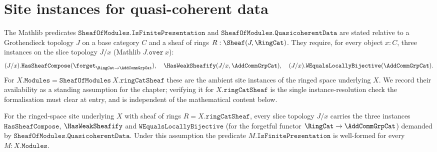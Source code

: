 \section{Site instances for quasi-coherent data}
\label{sec:lbc_site_instances}


The Mathlib predicates \(\mathtt{SheafOfModules.IsFinitePresentation}\) and
\(\mathtt{SheafOfModules.QuasicoherentData}\) are stated relative to a
Grothendieck topology \(J\) on a base category \(C\) and a sheaf of rings
\(R : \Sheaf(J, \RingCat)\). They require, for every object \(x : C\), three
instances on the slice topology \(J/x\) (Mathlib \(J.\mathtt{over}\ x\)):
\[
  (J/x).\mathtt{HasSheafCompose}(\forget_{\RingCat \to \AddCommGrpCat}),\quad
  \HasWeakSheafify(J/x, \AddCommGrpCat),\quad
  (J/x).\mathtt{WEqualsLocallyBijective}(\AddCommGrpCat).
\]
For \(X.\mathtt{Modules} = \mathtt{SheafOfModules}\ X.\mathtt{ringCatSheaf}\)
these are the ambient site instances of the ringed space underlying \(X\). We
record their availability as a standing assumption for the chapter; verifying it
for \(X.\mathtt{ringCatSheaf}\) is the single instance-resolution check the
formalisation must clear at entry, and is independent of the mathematical
content below.

\begin{remark}
  \label{rem:lbc_site_instances}
  For the ringed-space site underlying \(X\) with sheaf of rings
  \(R = X.\mathtt{ringCatSheaf}\), every slice topology \(J/x\) carries the
  three instances \(\mathtt{HasSheafCompose}\), \(\HasWeakSheafify\) and
  \(\mathtt{WEqualsLocallyBijective}\) (for the forgetful functor
  \(\RingCat \to \AddCommGrpCat\)) demanded by
  \(\mathtt{SheafOfModules.QuasicoherentData}\). Under this assumption the
  predicate \(M.\mathtt{IsFinitePresentation}\) is well-formed for every
  \(M : X.\mathtt{Modules}\).
\end{remark}

